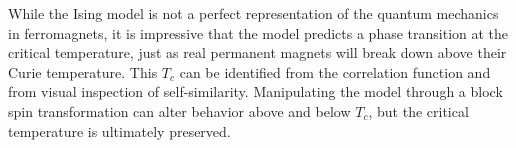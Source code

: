 While the Ising model is not a perfect representation of the quantum mechanics in ferromagnets, it is impressive that the model predicts a phase transition at the critical temperature, just as real permanent magnets will break down above their Curie temperature. This $T_c$ can be identified from the correlation function and from visual inspection of self-similarity. Manipulating the model through a block spin transformation can alter behavior above and below $T_c$, but the critical temperature is ultimately preserved.